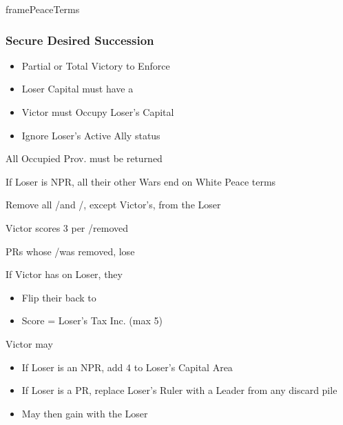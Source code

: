 \documentclass[10pt]{article}
\newlength{\fhPeaceTerms} \setlength\fhPeaceTerms{45.5\baselineskip}
\begin{document}
\begin{dynamiccontents*}{framePeaceTerms}
\begin{eubox}{\fhPeaceTerms}
\begin{multicols}{3}
		\subsubsection*{Secure Desired Succession}
		\begin{itemize}
			{
				\color{peaceReqColor}
				\item {}
				\begin{itemize}
					\item Partial or Total Victory to Enforce
					\item Loser Capital must have a \disputedsuccession
					\item Victor must Occupy Loser's Capital
					\item Ignore Loser's Active Ally status
				\end{itemize}
			}
			\item All Occupied Prov. must be returned
			\item If Loser is NPR, all their other Wars end on White Peace terms
			\item Remove all \marriage/\disputedsuccession and \alliance/\activeally, except Victor's, from the Loser
			\item Victor scores 3 per \marriage/\disputedsuccession removed
			\item PRs whose \marriage/\disputedsuccession was removed, lose 
			\item If Victor has \disputedsuccession on Loser, they
			\begin{itemize}
				\item Flip their \disputedsuccession back to \marriage
				\item Score \prestige = Loser's Tax Inc. (max 5)
			\end{itemize}
			\item Victor may
			\begin{itemize}
				\item If Loser is an NPR, add 4 \influence to Loser's Capital Area
				\item If Loser is a PR, replace Loser's Ruler with a Leader from any discard pile
				\item May then gain \alliance with the Loser
			\end{itemize}
		\end{itemize}


\end{multicols}
\end{eubox}
\end{dynamiccontents*}
\end{document}
